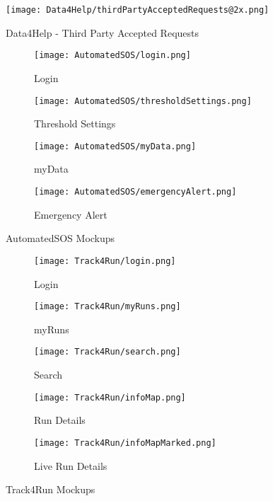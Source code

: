 \begin{figure}
  \texttt{[image: Data4Help/thirdPartyAcceptedRequests@2x.png]}
  \caption{Data4Help - Third Party Accepted Requests}
  \label{Data4Help - Third Party Accepted Requests}
\end{figure}


\begin{figure}[!ht]
  \centering
  \begin{subfigure}[b]{0.4\linewidth}
    \texttt{[image: AutomatedSOS/login.png]}
    \caption{Login}
  \end{subfigure}\hfill
  \begin{subfigure}[b]{0.4\linewidth}
    \texttt{[image: AutomatedSOS/thresholdSettings.png]}
    \caption{Threshold Settings}
  \end{subfigure}
  \par\bigskip
  \begin{subfigure}[b]{0.4\linewidth}
    \texttt{[image: AutomatedSOS/myData.png]}
    \caption{myData}
  \end{subfigure}\hfill
  \begin{subfigure}[b]{0.4\linewidth}
    \texttt{[image: AutomatedSOS/emergencyAlert.png]}
    \caption{Emergency Alert}
  \end{subfigure}
  \caption{AutomatedSOS Mockups}
\end{figure}


\begin{figure}[!ht]
  \centering
  \begin{subfigure}[b]{0.4\linewidth}
    \texttt{[image: Track4Run/login.png]}
    \caption{Login}
  \end{subfigure}\hfill
  \begin{subfigure}[b]{0.4\linewidth}
    \texttt{[image: Track4Run/myRuns.png]}
    \caption{myRuns}
  \end{subfigure}
  \par\bigskip
  \begin{subfigure}[b]{0.3\linewidth}
    \texttt{[image: Track4Run/search.png]}
    \caption{Search}
  \end{subfigure}\hfill
  \begin{subfigure}[b]{0.3\linewidth}
    \texttt{[image: Track4Run/infoMap.png]}
    \caption{Run Details}
  \end{subfigure}\hfill
  \begin{subfigure}[b]{0.3\linewidth}
    \texttt{[image: Track4Run/infoMapMarked.png]}
    \caption{Live Run Details}
  \end{subfigure}
  \caption{Track4Run Mockups}
\end{figure}